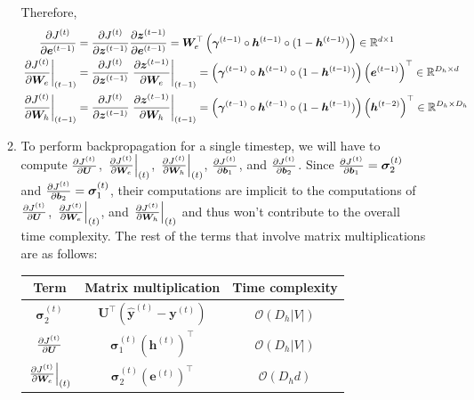 \documentclass[10pt,reqno]{amsart}
\begin{document}
\begin{enumerate}[topsep=0pt,itemsep=3ex,partopsep=1ex,parsep=1ex]
\begin{enumerate}[itemsep=2ex]
    Therefore,
    \begin{align*}
      \frac{\partial J^{(t)}}{\partial \bm{e}^{(t-1)}}
      &= \frac{\partial J^{(t)}}{\partial \bm{z}^{(t-1)}} \frac{\partial \bm{z}^{(t-1)}}{\partial \bm{e}^{(t-1)}} 
      = \bm{W}_e^\top \left( \bm{\gamma}^{(t-1)} \circ \bm{h}^{(t-1)} \circ (1 - \bm{h}^{(t-1)}) \right)
      \in \mathbb{R}^{d\times 1} \\
      \left. \frac{\partial J^{(t)}}{\partial \bm{W}_e} \right\rvert_{(t-1)}
      &= \frac{\partial J^{(t)}}{\partial \bm{z}^{(t-1)}} \left. \frac{\partial \bm{z}^{(t-1)}}{\partial \bm{W}_e} \right\rvert_{(t-1)}
      = \left( \bm{\gamma}^{(t-1)} \circ \bm{h}^{(t-1)} \circ (1 - \bm{h}^{(t-1)}) \right) \left(\bm{e}^{(t-1)}\right)^\top
      \in \mathbb{R}^{D_h \times d} \\
      \left. \frac{\partial J^{(t)}}{\partial \bm{W}_h} \right\rvert_{(t-1)}
      &= \frac{\partial J^{(t)}}{\partial \bm{z}^{(t-1)}} \left. \frac{\partial \bm{z}^{(t-1)}}{\partial \bm{W}_h} \right\rvert_{(t-1)}
      = \left( \bm{\gamma}^{(t-1)} \circ \bm{h}^{(t-1)} \circ (1 - \bm{h}^{(t-1)}) \right) \left(\bm{h}^{(t-2)}\right)^\top
      \in \mathbb{R}^{D_h \times D_h} 
    \end{align*}
  \item 
    To perform backpropagation for a single timestep, 
    we will have to compute $\frac{\partial J^{(t)}}{\partial \bm{U}}$,
    $\left. \frac{\partial J^{(t)}}{\partial \bm{W}_e} \right\rvert_{(t)}$,
    $\left. \frac{\partial J^{(t)}}{\partial \bm{W}_h} \right\rvert_{(t)}$,
    $\frac{\partial J^{(t)}}{\partial \bm{b}_1}$, and $\frac{\partial J^{(t)}}{\partial \bm{b}_2}$. 
    Since $\frac{\partial J^{(t)}}{\partial \bm{b}_1} = \bm{\sigma}^{(t)}_2$ and $\frac{\partial J^{(t)}}{\partial \bm{b}_2} = \bm{\sigma}^{(t)}_1$, 
    their computations are implicit to the computations of
    $\frac{\partial J^{(t)}}{\partial \bm{U}}$,
    $\left. \frac{\partial J^{(t)}}{\partial \bm{W}_e} \right\rvert_{(t)}$, and 
    $\left. \frac{\partial J^{(t)}}{\partial \bm{W}_h} \right\rvert_{(t)}$ 
    and thus won't contribute to the overall time complexity. 
    The rest of the terms that involve matrix multiplications are as follows:
    \vspace{1mm}
    \begin{center}
      \begin{tabular}{|c|c|c|}
        \hline
        Term & Matrix multiplication & Time complexity \\
        \hline
        $\bm{\sigma}^{(t)}_2$ & $\bm{U}^\top \left(\bm{\hat{y}}^{(t)} - \bm{y}^{(t)} \right)$ & $\mathcal{O}(D_h |V|)$ \\
        $\frac{\partial J^{(t)}}{\partial \bm{U}}$ & $\bm{\sigma}^{(t)}_1 \left(\bm{h}^{(t)}\right)^\top$ & $\mathcal{O}(D_h |V|)$ \\
        $\left. \frac{\partial J^{(t)}}{\partial \bm{W}_e} \right\rvert_{(t)}$ & $\bm{\sigma}^{(t)}_2 \left(\bm{e}^{(t)}\right)^\top$ & $\mathcal{O}(D_h d)$ \\

\end{tabular}
\end{center}
\end{enumerate}
\end{enumerate}
\end{document}
